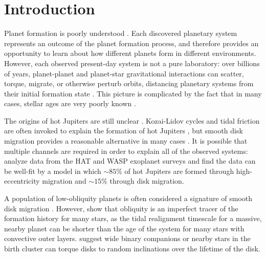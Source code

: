 \documentclass[twocolumn]{aastex63}
\begin{document}


 
\section{Introduction} \label{sec:intro}

Planet formation is poorly understood \citep[e.g.][]{Morbidelli16}. 
Each discovered planetary system represents an outcome of the planet formation process, and therefore provides an opportunity to learn about how different planets form in different environments. 
However, each observed present-day system is not a pure laboratory: over billions of years, planet-planet and planet-star gravitational interactions can scatter, torque, migrate, or otherwise perturb orbits, distancing planetary systems from their initial formation state \citep{Kozai62, Lidov62, Fabrycky07, Chatterjee08}. 
This picture is complicated by the fact that in many cases, stellar ages are very poorly known \citep[e.g.][]{Barnes07, Soderblom10}.

The origins of hot Jupiters are still unclear \citep{Dawson18}.
Kozai-Lidov cycles and tidal friction are often invoked to explain the formation of hot Jupiters \citep{Fabrycky07}, but smooth disk migration provides a reasonable alternative in many cases \citep{Ida08}. 
It is possible that multiple channels are required in order to explain all of the observed systems: \citet{Nelson17} analyze data from the HAT and WASP exoplanet surveys and find the data can be well-fit by a model in which $\sim85\%$ of hot Jupiters are formed through high-eccentricity migration and $\sim15\%$ through disk migration.

A population of low-obliquity planets is often considered a signature of smooth disk migration \citep{Morton11a, Ford14}. However, \citet{Albrecht12} show that obliquity is an imperfect tracer of the formation history for many stars, as the tidal realignment timescale for a massive, nearby planet can be shorter than the age of the system for many stars with convective outer layers.
\citet{Batygin12} suggest wide binary companions or nearby stars in the birth cluster can torque disks to random inclinations over the lifetime of the disk. 
\end{document}
